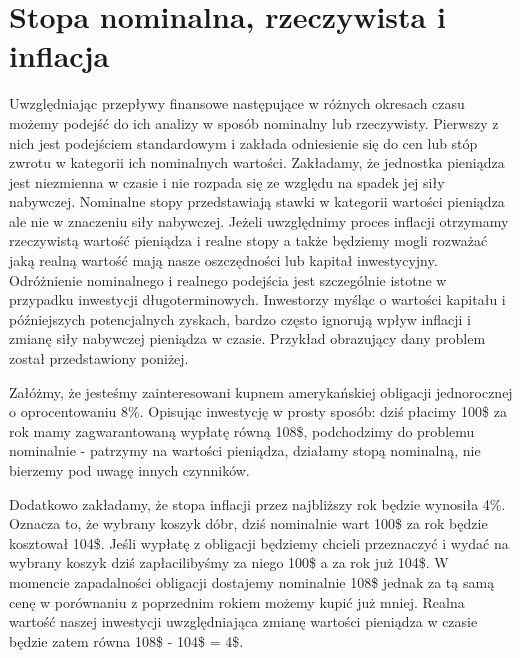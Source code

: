 \documentclass{mini}
\theoremstyle{mythstyle}
\begin{document}
	\section{Stopa nominalna, rzeczywista i inflacja}
	Uwzględniając przepływy finansowe następujące w różnych okresach czasu możemy podejść do ich analizy w sposób nominalny lub rzeczywisty. Pierwszy z nich jest podejściem standardowym i zakłada odniesienie się do cen lub stóp zwrotu w kategorii ich nominalnych wartości. Zakładamy, że jednostka pieniądza jest niezmienna w czasie i nie rozpada się ze względu na spadek jej siły nabywczej. Nominalne stopy przedstawiają stawki w kategorii wartości pieniądza ale nie w znaczeniu siły nabywczej. Jeżeli uwzględnimy proces inflacji otrzymamy rzeczywistą wartość pieniądza i realne stopy a także będziemy mogli rozważać jaką realną wartość mają nasze oszczędności lub kapitał inwestycyjny. Odróżnienie nominalnego i realnego podejścia jest szczególnie istotne w przypadku inwestycji długoterminowych. Inwestorzy myśląc o wartości kapitału i późniejszych potencjalnych zyskach, bardzo często ignorują wpływ inflacji i zmianę siły nabywczej pieniądza w czasie. Przykład obrazujący dany problem został przedstawiony poniżej.
	
	Załóżmy, że jesteśmy zainteresowani kupnem amerykańskiej obligacji jednorocznej o oprocentowaniu 8\%. Opisując inwestycję w prosty sposób: dziś płacimy 100\$ za rok mamy zagwarantowaną wypłatę równą 108\$, podchodzimy do problemu nominalnie - patrzymy na wartości pieniądza, działamy stopą nominalną, nie bierzemy pod uwagę innych czynników. 
			
	Dodatkowo zakładamy, że stopa inflacji przez najbliższy rok będzie  wynosiła 4\%. Oznacza to, że wybrany koszyk dóbr, dziś nominalnie wart 100\$ za rok będzie kosztował 104\$. Jeśli wypłatę z obligacji będziemy chcieli przeznaczyć i wydać na wybrany koszyk dziś zapłacilibyśmy za niego 100\$ a za rok już 104\$. W momencie zapadalności obligacji dostajemy nominalnie 108\$ jednak za tą samą cenę w porównaniu z poprzednim rokiem możemy kupić już mniej. Realna wartość naszej inwestycji uwzględniająca zmianę wartości pieniądza w czasie będzie zatem równa 108\$ - 104\$ = 4\$.\\
		
\end{document}
